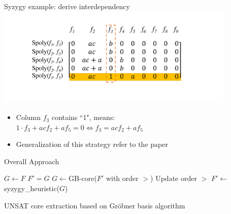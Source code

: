 \documentclass[xcolor=dvipsnames]{beamer}
\newcommand{\bi}{\begin{itemize}}
\newcommand{\ei}{\end{itemize}}
\begin{document}
\begin{frame}{\large{Syzygy example: derive interdependency}}
\includegraphics[width=4.5in]{./syzygy_4.pdf}
\bi
\item Column $f_3$ contains ``1", means:\\
$1\cdot f_3 + ac f_2 + a f_5 = 0\Leftrightarrow f_3 = acf_2+af_5$
\item Generalization of this strategy refer to the paper
\ei
\end{frame}
\begin{frame}{\large{Overall Approach}}
\begin{algorithm}[H] %
\SetAlgoNoLine
 $G \gets F$\;
  {
	$F' = G$\;
  	$G \gets $GB-core($F'$ with order $>$)\;
	Update order $>$\;
  }
  $F'\gets$syzygy\_heuristic($G$)\;
\caption {UNSAT core extraction based on Gr\"obner basis algorithm}
\end{algorithm}
\end{frame}
\end{document}
